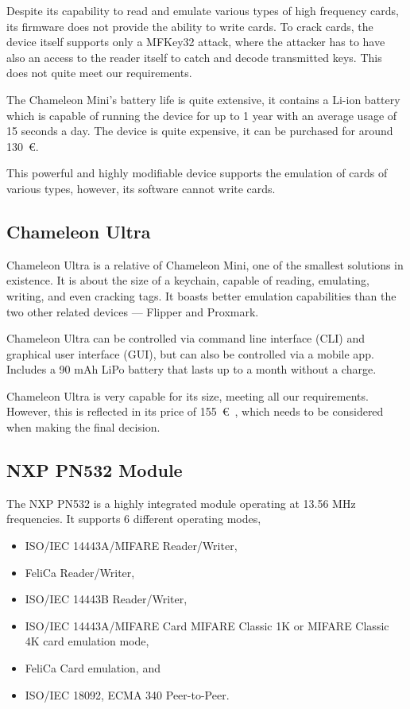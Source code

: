 Despite its capability to read and emulate various types of high frequency cards, its firmware does not provide the ability to write cards. To crack cards, the device itself supports only a MFKey32 attack, where the attacker has to have also an access to the reader itself to catch and decode transmitted keys. This does not quite meet our requirements.~\cite{lab401chameleon}

The Chameleon Mini's battery life is quite extensive, it contains a Li-ion battery which is capable of running the device for up to 1 year with an average usage of 15 seconds a day. The device is quite expensive, it can be purchased for around 130~€.~\cite{lab401chameleon}

This powerful and highly modifiable device supports the emulation of cards of various types, however, its software cannot write cards.


\subsection{Chameleon Ultra}

Chameleon Ultra is a relative of Chameleon Mini, one of the smallest solutions in existence. It is about the size of a keychain, capable of reading, emulating, writing, and even cracking tags. It boasts better emulation capabilities than the two other related devices --- Flipper and Proxmark.~\cite{chameleonultra}

Chameleon Ultra can be controlled via command line interface (CLI) and graphical user interface (GUI), but can also be controlled via a mobile app. Includes a 90 mAh LiPo battery that lasts up to a month without a charge.~\cite{chameleonultra}

Chameleon Ultra is very capable for its size, meeting all our requirements. However, this is reflected in its price of 155~€~\cite{chameleonultra}, which needs to be considered when making the final decision.


\subsection{NXP PN532 Module}

The NXP PN532 is a highly integrated module operating at 13.56 MHz frequencies. It supports 6 different operating modes,
\begin{itemize}
    \item ISO/IEC 14443A/MIFARE Reader/Writer,
    \item FeliCa Reader/Writer,
    \item ISO/IEC 14443B Reader/Writer,
    \item ISO/IEC 14443A/MIFARE Card MIFARE Classic 1K or MIFARE Classic 4K card emulation mode,
    \item FeliCa Card emulation, and
    \item ISO/IEC 18092, ECMA 340 Peer-to-Peer.~\cite{pn532doc}
\end{itemize}

